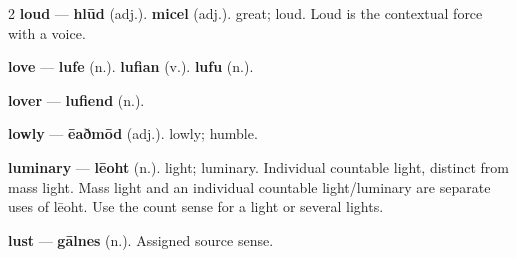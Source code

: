 \begin{multicols}{2}
\textbf{loud} — \textbf{hlūd} (adj.).  \textbf{micel} (adj.). great; loud. Loud is the contextual force with a voice.\par
\textbf{love} — \textbf{lufe} (n.).  \textbf{lufian} (v.).  \textbf{lufu} (n.).\par
\textbf{lover} — \textbf{lufiend} (n.).\par
\textbf{lowly} — \textbf{ēaðmōd} (adj.). lowly; humble.\par
\textbf{luminary} — \textbf{lēoht} (n.). light; luminary. Individual countable light, distinct from mass light. Mass light and an individual countable light/luminary are separate uses of lēoht. Use the count sense for a light or several lights.\par
\textbf{lust} — \textbf{gālnes} (n.). Assigned source sense.\par

\end{multicols}

